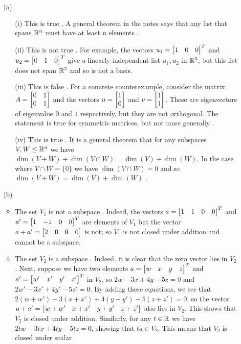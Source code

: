 \documentclass[a4paper]{article}
\begin{document}
\begin{solution}
 \begin{itemize}
  \item[(a)]
   \begin{itemize}
    \item[(i)] This is true \mk.  A general theorem in the notes says
     that any list that spans ${\mathbb{R}}^n$ must have at least $n$ elements \mk.
    \item[(ii)] This is not true \mk.  For example, the vectors
     $u_1=\left[\begin{matrix} 1&0&0\end{matrix}\right]^T$ and $u_2=\left[\begin{matrix} 0&1&0\end{matrix}\right]^T$ give a linearly
     independent list $u_1,u_2$ in ${\mathbb{R}}^3$, but this list does not span
     ${\mathbb{R}}^3$ and so is not a basis. \mk
    \item[(iii)] This is false \mk.  For a concrete counterexample,
     consider the matrix $A=\left[\begin{matrix} 0&1\\0&1\end{matrix}\right]$ and the vectors
     $u=\left[\begin{matrix} 1\\0\end{matrix}\right]$ and $v=\left[\begin{matrix} 1\\1\end{matrix}\right]$.  These are eigenvectors
     of eigenvalue $0$ and $1$ respectively, but they are not
     orthogonal.  The statement is true for symmetric matrices, but
     not more generally .
    \item[(iv)] This is true \mk.  It is a general theorem that for any
     subspaces $V,W\leq{\mathbb{R}}^n$ we have
     $\dim(V+W)+\dim(V\cap W)=\dim(V)+\dim(W)$.  In the case where
     $V\cap W=\{0\}$ we have $\dim(V\cap W)=0$ and so
     $\dim(V+W)=\dim(V)+\dim(W)$ \mk.  
   \end{itemize}
  \item[(b)] 
   \begin{itemize}
    \item The set $V_1$ is not a subspace \mk.  Indeed, the
     vectors $a=\left[\begin{matrix} 1&1&0&0\end{matrix}\right]^T$ and $a'=\left[\begin{matrix} 1&-1&0&0\end{matrix}\right]^T$ are
     elements of $V_1$ but the vector $a+a'=\left[\begin{matrix} 2&0&0&0\end{matrix}\right]$ is not;
     so $V_1$ is not closed under addition and cannot be a subspace. \mk
    \item The set $V_2$ is a subspace \mk.  Indeed, it is clear that
     the zero vector lies in $V_2$.  Next, suppose we have two elements
     $a=\left[\begin{matrix} w&x&y&z\end{matrix}\right]^T$ and $a'=\left[\begin{matrix} w'&x'&y'&z'\end{matrix}\right]^T$ in $V_2$, so
     $2w-3x+4y-5z=0$ and $2w'-3x'+4y'-5z'=0$.  By adding these
     equations, we see that $2(w+w')-3(x+x')+4(y+y')-5(z+z')=0$, so
     the vector $a+a'=\left[\begin{matrix} w+w'&x+x'&y+y'&z+z'\end{matrix}\right]$ also lies in
     $V_2$.  This shows that $V_2$ is closed under addition.
     Similarly, for any $t\in{\mathbb{R}}$ we have $2tw-3tx+4ty-5tz=0$, showing
     that $ta\in V_2$.  This means that $V_2$ is closed under scalar

\end{itemize}
\end{itemize}
\end{solution}
\end{document}
